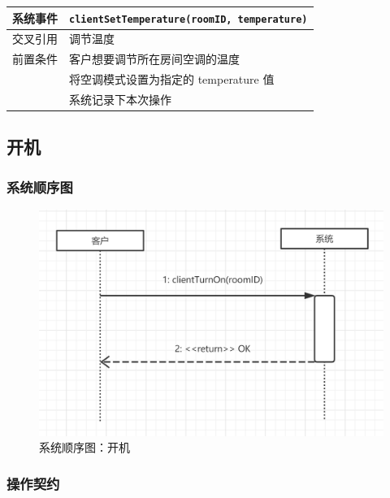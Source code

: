 \documentclass[black,normal,cn]{elegantnote}
\newcommand{\code}[1]{\colorbox{light-gray}{\texttt{#1}}}
\begin{document}
\begin{center}
    \begin{tabular}{|>{\centering}m{}|m{}|}
        \hline
        系统事件 & \multicolumn{1}{l|}{\code{clientSetTemperature(roomID, temperature)}} \\
        \hline
        交叉引用 & 调节温度                                                              \\
        \hline
        前置条件 & 客户想要调节所在房间空调的温度                                        \\
        \hline
        \multirow{2}{*}{后置条件}
                 & 将空调模式设置为指定的 temperature 值                                 \\
        \cline{2-2}
                 & 系统记录下本次操作                                                    \\
        \hline
    \end{tabular}
\end{center}



\subsection{开机}

\subsubsection{系统顺序图}

\begin{figure}[H]
    \centering
    \includegraphics[width=.8\textwidth]{fig/250007.png}
    \caption{系统顺序图：开机}
    \label{fig:250007}
\end{figure}

\subsubsection{操作契约}
\end{document}
